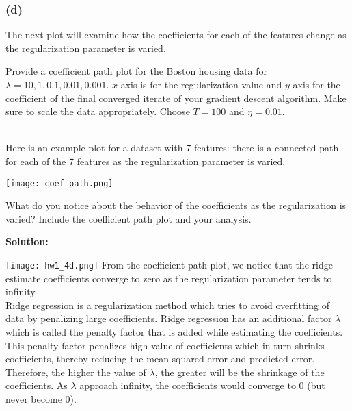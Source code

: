 \documentclass[11pt]{article}
\begin{document}
	\vfill
	
\subsubsection*{(d)}
The next plot will examine how the coefficients for each of the features change as the
	regularization parameter is varied. 
	
	Provide a coefficient path plot for the Boston housing data for $\lambda = 10, 1, 0.1, 0.01, 0.001$.
	$x$-axis is for the regularization value and $y$-axis
	for the coefficient of the final converged iterate of your gradient descent algorithm. 
	Make sure to scale the data appropriately. Choose $T = 100$ and $\eta = 0.01$.
	
	\ \\
	Here is an example plot for a dataset with 7 features: there is a connected path for each
	of the 7 features as the regularization parameter is varied.
	
	\texttt{[image: coef\_path.png]}
		
	
	What do you notice about the behavior of the coefficients
	as the regularization is varied? Include the coefficient path plot and your analysis.

{\noindent \bf Solution: 


\texttt{[image: hw1\_4d.png]}
 From the coefficient path plot, we notice that the ridge estimate coefficients converge to zero as the regularization parameter tends to infinity.
 \ \\
Ridge regression is a regularization method which tries to avoid overfitting of data by penalizing large coefficients. Ridge regression has an additional factor $\lambda$ which is called the penalty factor that is added while estimating the coefficients. This penalty factor penalizes high value of coefficients which in turn shrinks coefficients, thereby reducing the mean squared error and predicted error.
\ \\
Therefore, the higher the value of $\lambda$, the greater will be the shrinkage of the coefficients. As $\lambda$ approach infinity, the coefficients would converge to 0 (but never become 0). 
}
\end{document}
